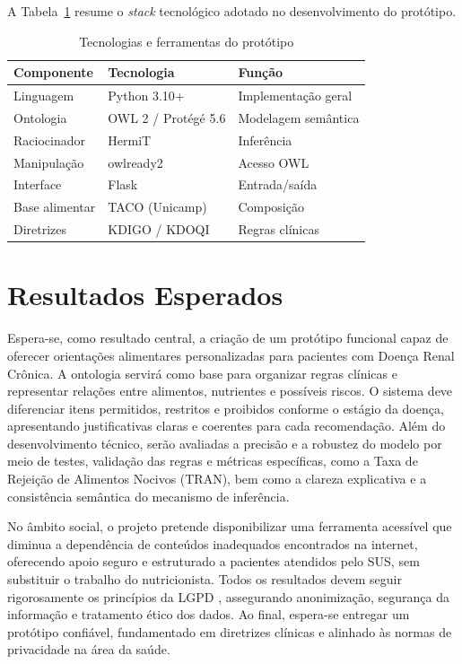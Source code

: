 \documentclass[12pt, a4paper, twocolumn]{article}
\begin{document}
A Tabela~\ref{tab:tecnologias} resume o \textit{stack} tecnológico adotado no desenvolvimento do protótipo.

\begin{table}[h]
\centering
\caption{Tecnologias e ferramentas do protótipo}
\label{tab:tecnologias}
\footnotesize
\begin{tabular}{|p{1.8cm}|p{2.5cm}|p{2.2cm}|}
\hline
\textbf{Componente} & \textbf{Tecnologia} & \textbf{Função} \\
\hline
Linguagem & Python 3.10+ & Implementação geral \\
\hline
Ontologia & OWL 2 / Protégé 5.6 & Modelagem semântica \\
\hline
Raciocinador & HermiT & Inferência \\
\hline
Manipulação & owlready2 & Acesso OWL \\
\hline
Interface & Flask & Entrada/saída \\
\hline
Base alimentar & TACO (Unicamp) & Composição \\
\hline
Diretrizes & KDIGO / KDOQI & Regras clínicas \\
\hline
\end{tabular}
\end{table}

\section{Resultados Esperados}

Espera-se, como resultado central, a criação de um protótipo funcional capaz de oferecer orientações alimentares personalizadas para pacientes com Doença Renal Crônica. A ontologia servirá como base para organizar regras clínicas e representar relações entre alimentos, nutrientes e possíveis riscos. O sistema deve diferenciar itens permitidos, restritos e proibidos conforme o estágio da doença, apresentando justificativas claras e coerentes para cada recomendação. Além do desenvolvimento técnico, serão avaliadas a precisão e a robustez do modelo por meio de testes, validação das regras e métricas específicas, como a Taxa de Rejeição de Alimentos Nocivos (TRAN), bem como a clareza explicativa e a consistência semântica do mecanismo de inferência.

No âmbito social, o projeto pretende disponibilizar uma ferramenta acessível que diminua a dependência de conteúdos inadequados encontrados na internet, oferecendo apoio seguro e estruturado a pacientes atendidos pelo SUS, sem substituir o trabalho do nutricionista. Todos os resultados devem seguir rigorosamente os princípios da LGPD \cite{brasil2018}, assegurando anonimização, segurança da informação e tratamento ético dos dados. Ao final, espera-se entregar um protótipo confiável, fundamentado em diretrizes clínicas e alinhado às normas de privacidade na área da saúde.
\end{document}
